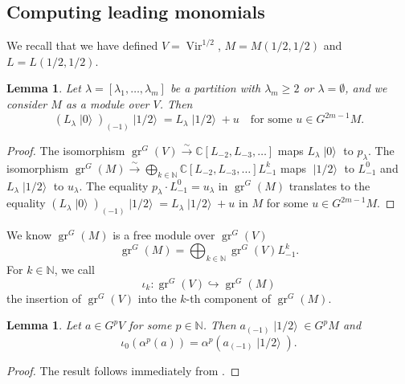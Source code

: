 \documentclass[a4paper, 12pt, reqno]{amsart}
\newtheorem{lemma}[theorem]{Lemma}
\theoremstyle{remark}
\DeclareMathOperator{\Vir}{Vir}
\DeclareMathOperator{\gr}{gr}
\DeclareMathOperator{\vac}{|0\rangle}
\DeclareMathOperator{\vachalf}{|1/2\rangle}
\begin{document}
\subsection{Computing leading monomials}
\label{sec:comp-lead-monom}

We recall that we have defined $V = \Vir^{1/2}$, $M = M(1/2, 1/2)$ and $L = L(1/2, 1/2)$.

\begin{lemma}
  \label{lmm:35}
  Let $\lambda = [\lambda_1, \dots, \lambda_m]$ be a partition with $\lambda_m \ge 2$ or $\lambda = \emptyset$, and we consider $M$ as a module over $V$.
  Then
  \begin{equation*}
    (L_{\lambda}\vac)_{(-1)}\vachalf = L_{\lambda}\vachalf + u \quad \text{for some $u \in G^{2m - 1}M$}.
  \end{equation*}
\end{lemma}

\begin{proof}
  The isomorphism $\gr^G(V) \xrightarrow{\sim} \mathbb{C}[L_{-2}, L_{-3}, \dots]$ maps $L_{\lambda}\vac$ to $p_{\lambda}$.
  The isomorphism $\gr^G(M) \xrightarrow{\sim} \bigoplus_{k \in \mathbb{N}}\mathbb{C}[L_{-2}, L_{-3}, \dots]L_{-1}^k$ maps $\vachalf$ to $L_{-1}^0$ and $L_{\lambda}\vachalf$ to $u_{\lambda}$.
  The equality $p_{\lambda}\cdot L_{-1}^0 = u_{\lambda}$ in $\gr^G(M)$ translates to the equality $(L_{\lambda}\vac)_{(-1)}\vachalf = L_{\lambda}\vachalf + u$ in $M$ for some $u \in G^{2m - 1}M$.
\end{proof}

We know $\gr^G(M)$ is a free module over $\gr^G(V)$
\begin{equation*}
  \gr^G(M) = \bigoplus_{k \in \mathbb{N}}\gr^G(V)L_{-1}^k.
\end{equation*}
For $k \in \mathbb{N}$, we call
\begin{equation*}
  \iota_k: \gr^G(V) \hookrightarrow \gr^G(M)
\end{equation*}
the insertion of $\gr^G(V)$ into the $k$-th component of $\gr^G(M)$.

\begin{lemma}
  \label{lmm:36}
  Let $a \in G^pV$ for some $p \in \mathbb{N}$.
  Then $a_{(-1)}\vachalf \in G^pM$ and
  \begin{equation*}
    \iota_0(\alpha^p(a)) = \alpha^p(a_{(-1)}\vachalf).
  \end{equation*}
\end{lemma}

\begin{proof}
  The result follows immediately from .
\end{proof}
\end{document}
